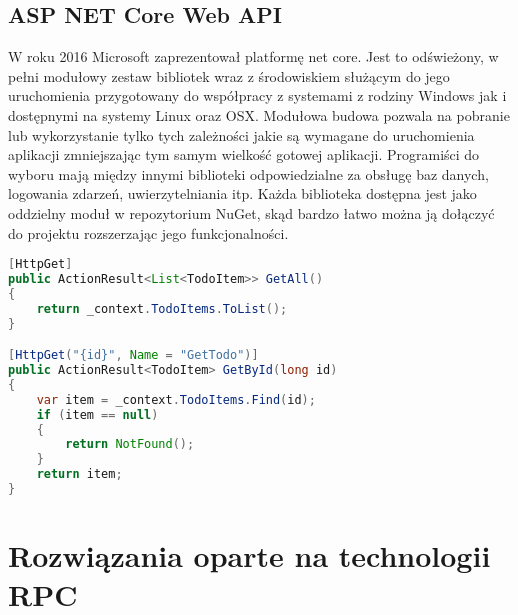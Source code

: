 \subsection{ASP NET Core Web API}
W roku 2016 Microsoft zaprezentował platformę net core. Jest to odświeżony, w pełni modułowy zestaw bibliotek wraz z środowiskiem służącym do jego uruchomienia przygotowany do współpracy z systemami z rodziny Windows jak i dostępnymi na systemy Linux oraz OSX. Modułowa budowa pozwala na pobranie lub wykorzystanie tylko tych zależności jakie są wymagane do uruchomienia aplikacji zmniejszając tym samym wielkość gotowej aplikacji. Programiści do wyboru mają między innymi biblioteki odpowiedzialne za obsługę baz danych, logowania zdarzeń, uwierzytelniania itp. Każda biblioteka dostępna jest jako oddzielny moduł w repozytorium NuGet, skąd bardzo łatwo można ją dołączyć do projektu rozszerzając\cite{reynders2018modern} jego funkcjonalności.
\begin{lstlisting}[language=java, caption=Przykład definicji adresów URI dla metod http w kontrolerze]
[HttpGet]
public ActionResult<List<TodoItem>> GetAll()
{
    return _context.TodoItems.ToList();
}

[HttpGet("{id}", Name = "GetTodo")] 
public ActionResult<TodoItem> GetById(long id)
{
    var item = _context.TodoItems.Find(id);
    if (item == null)
    {
        return NotFound();
    }
    return item;
}
\end{lstlisting}
\section{Rozwiązania oparte na technologii RPC}
